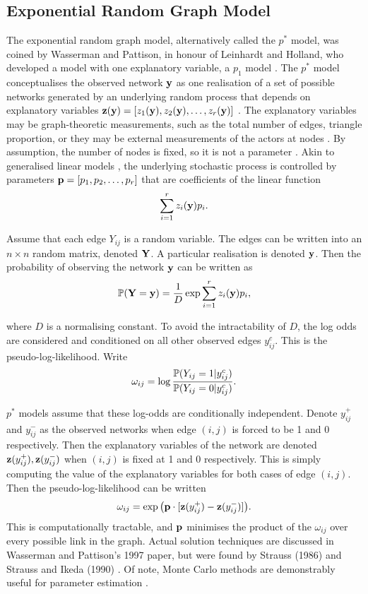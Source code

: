  \subsection{Exponential Random Graph Model}
 The exponential random graph model, alternatively called the $p^*$ model, was coined by Wasserman and Pattison, in honour of Leinhardt and Holland, who developed a model with one explanatory variable, a $p_1$ model \cite {RN83}. The $p^*$ model conceptualises the observed network $\mathbf{y}$ as one realisation of a set of possible networks generated by an underlying random process that depends on explanatory variables $\mathbf{z}(\mathbf{y}) = [z_1(\mathbf{y}), z_2(\mathbf{y}), \dots, z_r(\mathbf{y})]$ \cite{RN64}. The explanatory variables may be graph-theoretic measurements, such as the total number of edges, triangle proportion, or they may be external measurements of the actors at nodes \cite{RN86}. By assumption, the number of nodes is fixed, so it is not a parameter \cite{RN64}. Akin to generalised linear models \cite{RN83}, the underlying stochastic process is controlled by parameters $\mathbf{p} = [p_1,p_2,\dots,p_r]$ that are coefficients of the linear function $$\sum_{i=1}^r z_i(\mathbf{y})p_i. $$ 

 
 Assume that each edge $Y_{ij}$ is a random variable. The edges can be written into an $n\times n$ random matrix, denoted $\mathbf{Y}$. A particular realisation is denoted $\mathbf{y}$. Then the probability of observing the network $\mathbf{y}$ can be written as \\
 $$ \mathbb P (\mathbf{Y} = \mathbf{y}) = \frac{1}{D}\exp{\sum_{i=1}^r z_i(\mathbf{y})p_i},$$
 
 where $D$ is a normalising constant. To avoid the intractability of $D$, the log odds are considered and conditioned on all other observed edges $y_{ij}^c$. This is the pseudo-log-likelihood. Write 
 $$\omega_{ij} = \log{\frac{\mathbb P(Y_{ij} =1 | y_{ij}^c)}{\mathbb P(Y_{ij} =0 | y_{ij}^c)}}.$$ 
 
$p^*$ models assume that these log-odds are conditionally independent. Denote $y_{ij}^+$ and $y_{ij}^-$ as the observed networks when edge $(i,j)$ is forced to be 1 and 0 respectively. Then the explanatory variables of the network are denoted $\mathbf{z}(y_{ij}^+), \mathbf{z}(y_{ij}^-) $ when $(i,j)$ is fixed at 1 and 0 respectively. This is simply computing the value of the explanatory variables for both cases of edge $(i,j)$. Then the pseudo-log-likelihood can be written $$
 \omega_{ij} = \exp \big (\mathbf{p} \cdot [\mathbf{z}(y_{ij}^+) - \mathbf{z}(y_{ij}^-)] \big).$$
This is computationally tractable, and $\mathbf{p}$ minimises the product of the $\omega_{ij}$ over every possible link in the graph. Actual solution techniques are discussed in Wasserman and Pattison's 1997 paper, but were found by Strauss (1986) and Strauss and Ikeda (1990) \cite{RN83}. Of note, Monte Carlo methods are demonstrably useful for parameter estimation \cite{RN86}. \\

